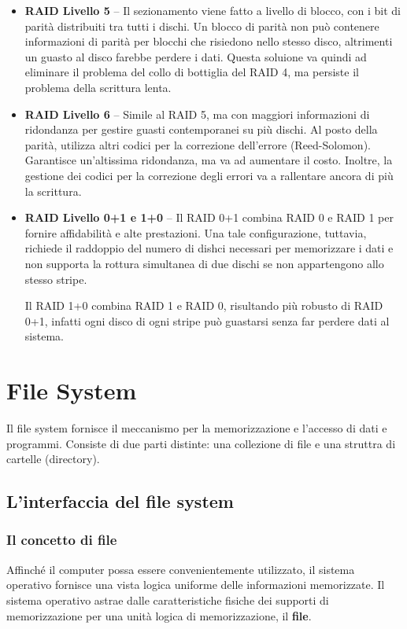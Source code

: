\documentclass[a4paper]{article}
\begin{document}
\begin{itemize}
   \item \textbf{RAID Livello 5} -- Il sezionamento viene fatto a livello di blocco, con i bit di parità distribuiti tra tutti i dischi. Un blocco di parità non può contenere informazioni di parità per blocchi che risiedono nello stesso disco, altrimenti un guasto al disco farebbe perdere i dati. Questa soluione va quindi ad eliminare il problema del collo di bottiglia del RAID 4, ma persiste il problema della scrittura lenta.
   \item \textbf{RAID Livello 6} -- Simile al RAID 5, ma con maggiori informazioni di ridondanza per gestire guasti contemporanei su più dischi. Al posto della parità, utilizza altri codici per la correzione dell'errore (Reed-Solomon). Garantisce un'altissima ridondanza, ma va ad aumentare il costo. Inoltre, la gestione dei codici per la correzione degli errori va a rallentare ancora di più la scrittura.
   \item \textbf{RAID Livello 0+1 e 1+0} -- Il RAID 0+1 combina RAID 0 e RAID 1 per fornire affidabilità e alte prestazioni. Una tale configurazione, tuttavia, richiede il raddoppio del numero di dishci necessari per memorizzare i dati e non supporta la rottura simultanea di due dischi se non appartengono allo stesso stripe.

         Il RAID 1+0 combina RAID 1 e RAID 0, risultando più robusto di RAID 0+1, infatti ogni disco di ogni stripe può guastarsi senza far perdere dati al sistema.
\end{itemize}

\newpage
\section{File System}
Il file system fornisce il meccanismo per la memorizzazione e l'accesso di dati e programmi. Consiste di due parti distinte: una collezione di file e una struttra di cartelle (directory).

\subsection{L'interfaccia del file system}

\subsubsection{Il concetto di file}
Affinché il computer possa essere convenientemente utilizzato, il sistema operativo fornisce una vista logica uniforme delle informazioni memorizzate. Il sistema operativo astrae dalle caratteristiche fisiche dei supporti di memorizzazione per una unità logica di memorizzazione, il \textbf{file}.
\end{document}
